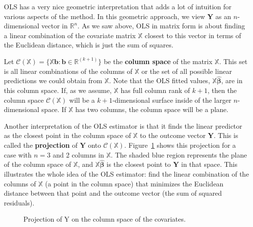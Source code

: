 \documentclass[
  13pt,
  letterpaper,
  DIV=11,
  numbers=noendperiod]{scrreprt}
\newcommand{\mb}{\symbf}
\newcommand{\Xmat}{\mathbb{X}}
\newcommand{\bhat}{\widehat{\mb{\beta}}}
\theoremstyle{definition}
\theoremstyle{definition}
\theoremstyle{plain}
\theoremstyle{remark}
\begin{document}
OLS has a very nice geometric interpretation that adds a lot of
intuition for various aspects of the method. In this geometric approach,
we view \(\mb{Y}\) as an \(n\)-dimensional vector in \(\mathbb{R}^n\).
As we saw above, OLS in matrix form is about finding a linear
combination of the covariate matrix \(\Xmat\) closest to this vector in
terms of the Euclidean distance, which is just the sum of squares.

Let
\(\mathcal{C}(\Xmat) = \{\Xmat\mb{b} : \mb{b} \in \mathbb{R}^(k+1)\}\)
be the \textbf{column space} of the matrix \(\Xmat\). This set is all
linear combinations of the columns of \(\Xmat\) or the set of all
possible linear predictions we could obtain from \(\Xmat\). Note that
the OLS fitted values, \(\Xmat\bhat\), are in this column space. If, as
we assume, \(\Xmat\) has full column rank of \(k+1\), then the column
space \(\mathcal{C}(\Xmat)\) will be a \(k+1\)-dimensional surface
inside of the larger \(n\)-dimensional space. If \(\Xmat\) has two
columns, the column space will be a plane.

Another interpretation of the OLS estimator is that it finds the linear
predictor as the closest point in the column space of \(\Xmat\) to the
outcome vector \(\mb{Y}\). This is called the \textbf{projection} of
\(\mb{Y}\) onto \(\mathcal{C}(\Xmat)\). Figure~\ref{fig-projection}
shows this projection for a case with \(n=3\) and 2 columns in
\(\Xmat\). The shaded blue region represents the plane of the column
space of \(\Xmat\), and \(\Xmat\bhat\) is the closest point to
\(\mb{Y}\) in that space. This illustrates the whole idea of the OLS
estimator: find the linear combination of the columns of \(\Xmat\) (a
point in the column space) that minimizes the Euclidean distance between
that point and the outcome vector (the sum of squared residuals).

\begin{figure}[th]


\caption{\label{fig-projection}Projection of Y on the column space of
the covariates.}

\end{figure}%
\end{document}
